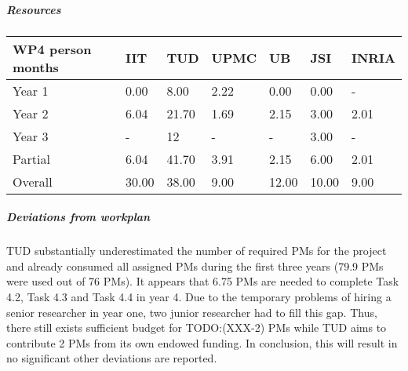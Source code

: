 
\subparagraph{Resources}

\begin{center}
\begin{tabular}{|C{1.5cm}|C{1.5cm}|C{1.5cm}|C{2cm}|C{2cm}|C{2cm}|C{2cm}|}
\hline
\footnotesize \textbf{WP4 person months}& \footnotesize \textbf{IIT}&\footnotesize \textbf{TUD}&\footnotesize \textbf{UPMC}& \footnotesize \textbf{UB} &\footnotesize \textbf{JSI} &\footnotesize \textbf{INRIA}\\ \hline
\footnotesize Year 1 &  0.00 & 8.00 & 2.22 & 0.00 & 0.00 & -     \\  \hline
\footnotesize Year 2 &  6.04 & 21.70 & 1.69 & 2.15 & 3.00 & 2.01     \\  \hline
\footnotesize Year 3 &  -    & 12    & -    & -    & 3.00 & -     \\  \hline
\footnotesize Partial &  6.04 & 41.70 & 3.91 & 2.15 & 6.00 & 2.01 \\ \hline \hline
\footnotesize Overall &  30.00 & 38.00 & 9.00 & 12.00 & 10.00 & 9.00 \\ \hline
\end{tabular}
\end{center}

\subparagraph{Deviations from workplan} 
TUD substantially underestimated the number of required PMs for the project and already consumed all assigned PMs during the first three years (79.9 PMs were used out of 76 PMs). It appears that 6.75 PMs are needed to complete Task 4.2, Task 4.3 and Task 4.4 in year 4. Due to the temporary problems of hiring a senior researcher in year one, two junior researcher had to fill this gap. Thus, there still exists sufficient budget for TODO:(XXX-2) PMs while TUD aims to contribute 2 PMs from its own endowed funding. In conclusion, this will result in no significant other deviations are reported.

